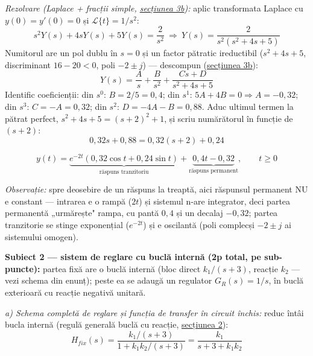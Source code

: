 \documentclass[10pt,a4paper]{article}
\newcommand{\tip}[1]{\textcolor{blue!55!black}{#1}}
\begin{document}
\textit{Rezolvare (Laplace + fracții simple, \hyperref[sec:3b]{secțiunea 3b}):} aplic transformata Laplace cu $y(0){=}y'(0){=}0$ și $\mathcal L\{t\}{=}1/s^2$:
$$s^2Y(s)+4sY(s)+5Y(s)=\dfrac2{s^2}\ \Rightarrow\ Y(s)=\dfrac2{s^2(s^2+4s+5)}$$
Numitorul are un pol dublu în $s{=}0$ și un factor pătratic ireductibil ($s^2{+}4s{+}5$, discriminant $16{-}20{<}0$, poli $-2{\pm}j$) — descompun (\hyperref[sec:3b]{secțiunea 3b}):
$$Y(s)=\dfrac As+\dfrac B{s^2}+\dfrac{Cs+D}{s^2+4s+5}$$
Identific coeficienții: din $s^0$: $B{=}2/5{=}0{,}4$; din $s^1$: $5A{+}4B{=}0\Rightarrow A{=}{-}0{,}32$; din $s^3$: $C{=}{-}A{=}0{,}32$; din $s^2$: $D{=}{-}4A{-}B{=}0{,}88$. Aduc ultimul termen la pătrat perfect, $s^2{+}4s{+}5{=}(s{+}2)^2{+}1$, și scriu numărătorul în funcție de $(s{+}2)$:
$$0{,}32s+0{,}88=0{,}32(s+2)+0{,}24$$
\begin{keyeq}\color{red!65!black}
$$y(t)=\underbrace{e^{-2t}(0{,}32\cos t+0{,}24\sin t)}_{\text{răspuns tranzitoriu}}+\underbrace{0{,}4t-0{,}32}_{\text{răspuns permanent}},\qquad t\ge0$$
\end{keyeq}
\tip{\textit{Observație:} spre deosebire de un răspuns la treaptă, aici răspunsul permanent NU e constant — intrarea e o rampă ($2t$) și sistemul n-are integrator, deci partea permanentă „urmărește" rampa, cu pantă $0{,}4$ și un decalaj $-0{,}32$; partea tranzitorie se stinge exponențial ($e^{-2t}$) și e oscilantă (poli complecși $-2{\pm}j$ ai sistemului omogen).}

\textbf{Subiect 2 — sistem de reglare cu buclă internă (2p total, pe sub-puncte):} partea fixă are o buclă internă (bloc direct $k_1/(s{+}3)$, reacție $k_2$ — vezi schema din enunț); peste ea se adaugă un regulator $G_R(s){=}1/s$, în buclă exterioară cu reacție negativă unitară.

\textit{a) Schema completă de reglare și funcția de transfer în circuit închis:} reduc întâi bucla internă (regulă generală buclă cu reacție, \hyperref[sec:2]{secțiunea 2}):
$$H_{fix}(s)=\dfrac{k_1/(s+3)}{1+k_1k_2/(s+3)}=\dfrac{k_1}{s+3+k_1k_2}$$
\end{document}
